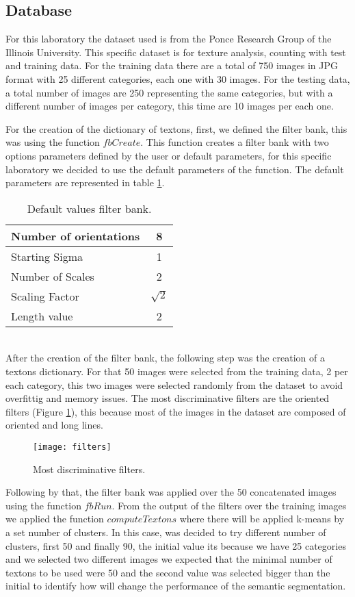 \documentclass[10pt,twocolumn,letterpaper]{article}
\begin{document}
\subsection{Database}
For this laboratory the dataset used is from the Ponce Research Group of the Illinois University. This specific dataset is for texture analysis, counting with test and training data. For the training data there are a total of 750 images in JPG format with 25 different categories, each one with 30 images. For the testing data, a total number of images are 250 representing the same categories, but with a different number of images per category, this time are 10 images per each one.

For the creation of the dictionary of textons, first, we defined the filter bank, this was using the function $fbCreate$. This function creates a filter bank with two options parameters defined by the user or default parameters, for this specific laboratory we decided to use the default parameters of the function. The default parameters are represented in table \ref{default}.
\begin{table}[h!]
 \centering
  \caption{Default values filter bank.}
  \label{default}
   \begin{tabular}{ |l | c | }
    \hline
    Number of orientations & 8 \\ \hline
    Starting Sigma & 1\\ \hline
    Number of Scales& 2 \\ \hline
    Scaling Factor& $\sqrt{2}$ \\ \hline
    Length value& 2 \\ \hline
  \end{tabular}
 \end{table}
\\

After the creation of the filter bank, the following step was the creation of a textons dictionary. For that  50 images were selected from the training data, 2 per each category, this two images were selected randomly from the dataset to avoid overfittig and memory issues.
The most discriminative filters are the oriented filters (Figure \ref{filters}), this because most of the images in the dataset are composed of oriented and long lines.
\begin{figure}[h]
\centering
\texttt{[image: filters]}
\caption{Most discriminative filters.}
\label{filters}
\centering
\end{figure}

Following by that, the filter bank was applied over the 50 concatenated images using the function $fbRun$. From the output of the filters over the training images we applied the function $computeTextons$ where there will be applied k-means by a set number of clusters. In this case, was decided to try different number of clusters, first 50 and finally 90, the initial value its because we have 25 categories and we selected two different images we expected that the minimal number of textons to be used were 50 and the second value was selected bigger than the initial to identify how will change the performance of the semantic segmentation. 
\end{document}
